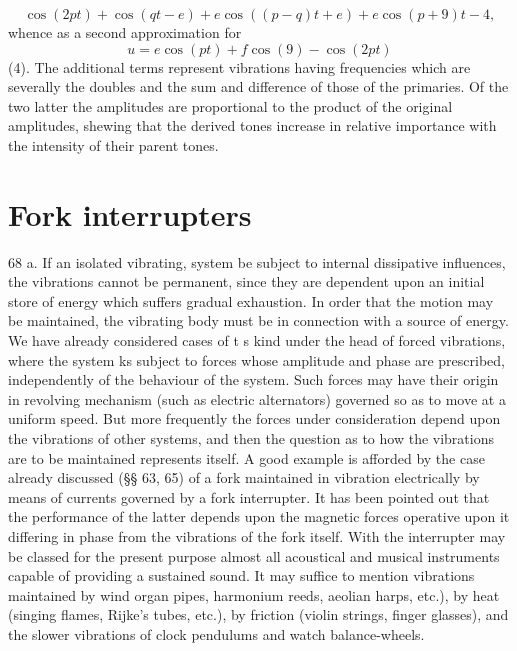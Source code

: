 \[\cos(2pt) + \cos(qt-e) + e \cos((p-q) t+ e) + e \cos(p + 9) t-4 ,\]
whence as
a second approximation for
\[u =e \cos(pt) + f \cos(9)  -  \cos(2pt)\]
 (4). The
additional terms represent vibrations having frequencies which are severally
the doubles and the sum and difference of those of the primaries. Of the two
latter the amplitudes are proportional to the product of the original
amplitudes, shewing that the derived tones increase in relative importance with
the intensity of their parent tones.

\section{Fork interrupters}\label{interrupter} 68 a.
If an isolated vibrating, system be subject to internal dissipative
influences, the vibrations cannot be permanent, since they are dependent
upon an initial store of energy which suffers gradual exhaustion. In
order that the motion may be maintained, the vibrating body must be in
connection with a source of energy. We have already considered cases of
t s kind under the head of forced vibrations, where the system ks
subject to forces whose amplitude and phase are prescribed,
independently of the behaviour of the system. Such forces may have their
origin in revolving mechanism (such as electric alternators) governed so
as to move at a uniform speed. But more frequently the forces under
consideration depend upon the vibrations of other systems, and then the
question as to how the vibrations are to be maintained represents
itself. A good example is afforded by the case already discussed (§§ 63, 65)
of a fork maintained in vibration electrically by means of currents
governed by a fork interrupter. It has been pointed out that the
performance of the latter depends upon the magnetic forces operative
upon it differing in phase from the vibrations of the fork itself. With
the interrupter may be classed for the present purpose almost all
acoustical and musical instruments capable of providing a sustained
sound. It may suffice to mention vibrations maintained by wind organ
pipes, harmonium reeds, aeolian harps, etc.), by heat (singing flames,
Rijke's tubes, etc.), by friction (violin strings, finger glasses), and
the slower vibrations of clock pendulums and watch balance-wheels.

